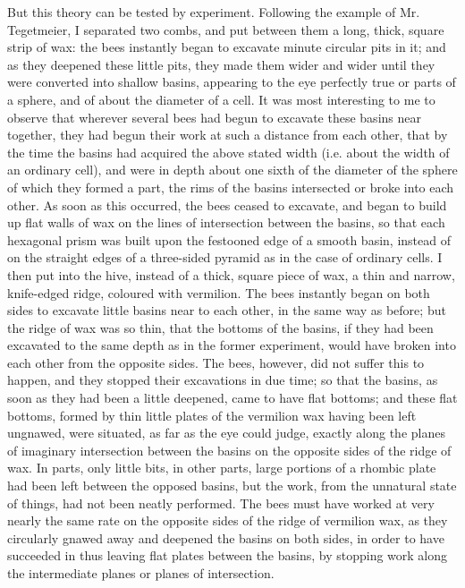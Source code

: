 But this theory can be tested by experiment. Following the example of Mr. Tegetmeier, I separated two combs, and put between them a long, thick, square strip of wax: the bees instantly began to excavate minute circular pits in it; and as they deepened these little pits, they made them wider and wider until they were converted into shallow basins, appearing to the eye perfectly true or parts of a sphere, and of about the diameter of a cell. It was most interesting to me to observe that wherever several bees had begun to excavate these basins near together, they had begun their work at such a distance from each other, that by the time the basins had acquired the above stated width (i.e. about the width of an ordinary cell), and were in depth about one sixth of the diameter of the sphere of which they formed a part, the rims of the basins intersected or broke into each other. As soon as this occurred, the bees ceased to excavate, and began to build up flat walls of wax on the lines of intersection between the basins, so that each hexagonal prism was built upon the festooned edge of a smooth basin, instead of on the straight edges of a three-sided pyramid as in the case of ordinary cells.
I then put into the hive, instead of a thick, square piece of wax, a thin and narrow, knife-edged ridge, coloured with vermilion. The bees instantly began on both sides to excavate little basins near to each other, in the same way as before; but the ridge of wax was so thin, that the bottoms of the basins, if they had been excavated to the same depth as in the former experiment, would have broken into each other from the opposite sides. The bees, however, did not suffer this to happen, and they stopped their excavations in due time; so that the basins, as soon as they had been a little deepened, came to have flat bottoms; and these flat bottoms, formed by thin little plates of the vermilion wax having been left ungnawed, were situated, as far as the eye could judge, exactly along the planes of imaginary intersection between the basins on the opposite sides of the ridge of wax. In parts, only little bits, in other parts, large portions of a rhombic plate had been left between the opposed basins, but the work, from the unnatural state of things, had not been neatly performed. The bees must have worked at very nearly the same rate on the opposite sides of the ridge of vermilion wax, as they circularly gnawed away and deepened the basins on both sides, in order to have succeeded in thus leaving flat plates between the basins, by stopping work along the intermediate planes or planes of intersection.
